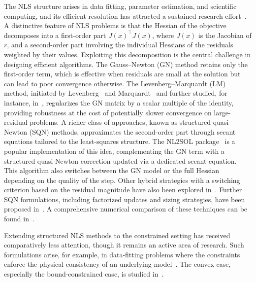\documentclass{article}
\numberwithin{equation}{section}
\theoremstyle{plain}
\begin{document}
	The NLS structure arises in data fitting, parameter estimation, and scientific computing, and its efficient resolution has attracted a sustained research effort~\cite{dennisschnabel:1996,nocedalwright:2006,bjork:2024}. 
	A distinctive feature of NLS problems is that the Hessian of the objective decomposes into a first-order part $J(x)^\top J(x)$, where $J(x)$ is the Jacobian of $r$, and a second-order part involving the individual Hessians of the residuals weighted by their values. Exploiting this decomposition is the central challenge in designing
	efficient algorithms.
	The Gauss--Newton (GN) method retains only the first-order term, which is effective when residuals are small at the solution but can lead to poor convergence otherwise.
	The Levenberg--Marquardt (LM) method, initiated by Levenberg~\cite{levenberg:1944} and Marquardt~\cite{marquardt:1963} and further studied, for instance, in~\cite{bellavia-etal:2018, bergou-etal:2021}, regularizes the GN matrix by a scalar multiple of the identity, providing robustness at the cost of potentially slower convergence on large-residual problems.
	A richer class of approaches, known as structured quasi-Newton (SQN) methods, approximates the second-order part through secant equations tailored to the least-squares structure. The NL2SOL package~\cite{dennisetal:1981,dennis-etal:1989} is a popular implementation of this idea, complementing the GN term with a structured quasi-Newton correction updated via a dedicated secant equation. This algorithm also switches between the GN model or the full Hessian depending on the quality of the step. Other hybrid strategies with a switching criterion based on the residual magnitude have also been explored in~\cite{albaalifletcher:1985, fletcherxu:1987, zhouchen:2010}. Further SQN formulations, including factorized updates and sizing strategies, have been proposed in~\cite{biggs:1977, betts:1976, huschens1994, yabetakahashi:1991, zhang-etal:2000}. A comprehensive numerical comparison of these techniques can be found in~\cite{lucksan-etal:2019}.
	
	Extending structured NLS methods to the constrained setting has received comparatively less attention, though it remains an active area of research. Such formulations arise, for example, in data-fitting problems where the constraints enforce the physical consistency of an underlying model~\cite{grenieretal:2006, delbos-etal2006, pu-etal:2015}. The convex case, especially the bound-constrained case, is studied in~\cite{bellavia-etal:2004, bellavia-etal:2011, porcelli:2013, goncalvesmenezes:2020}.
	
\end{document}
